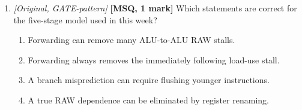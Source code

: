 \documentclass[11pt]{article}
\begin{document}
\begin{enumerate}
\item[\textbf{Q8}] \textit{[Original, GATE-pattern]} \textbf{[MSQ, 1 mark]}
Which statements are correct for the five-stage model used in this week?
\begin{enumerate}
  \item[(A)] Forwarding can remove many ALU-to-ALU RAW stalls.
  \item[(B)] Forwarding always removes the immediately following load-use
  stall.
  \item[(C)] A branch misprediction can require flushing younger instructions.
  \item[(D)] A true RAW dependence can be eliminated by register renaming.
\end{enumerate}
\end{enumerate}
\end{document}
